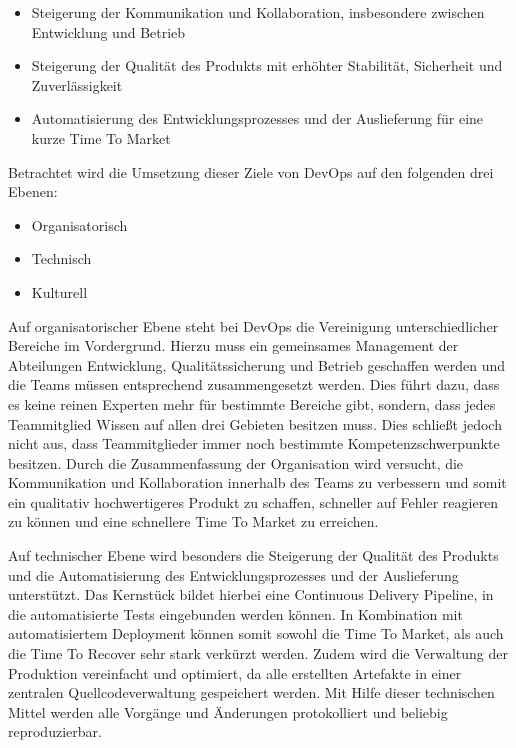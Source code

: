 \begin{itemize}
\item Steigerung der Kommunikation und Kollaboration, insbesondere zwischen Entwicklung und Betrieb
\item Steigerung der Qualität des Produkts mit erhöhter Stabilität, Sicherheit und Zuverlässigkeit
\item Automatisierung des Entwicklungsprozesses und der Auslieferung für eine kurze Time To Market
\end{itemize}

Betrachtet wird die Umsetzung dieser Ziele von DevOps auf den folgenden drei Ebenen: 

\begin{itemize}
\item Organisatorisch
\item Technisch
\item Kulturell
\end{itemize}

Auf organisatorischer Ebene steht bei DevOps die Vereinigung unterschiedlicher Bereiche im Vordergrund. 
Hierzu muss ein gemeinsames Management der Abteilungen Entwicklung, Qualitätssicherung und Betrieb geschaffen werden und die Teams müssen entsprechend zusammengesetzt werden. 
Dies führt dazu, dass es keine reinen Experten mehr für bestimmte Bereiche gibt, sondern, dass jedes Teammitglied Wissen auf allen drei Gebieten besitzen muss. 
Dies schließt jedoch nicht aus, dass Teammitglieder immer noch bestimmte Kompetenzschwerpunkte besitzen. 
Durch die Zusammenfassung der Organisation wird versucht, die Kommunikation und Kollaboration innerhalb des Teams zu verbessern und somit ein qualitativ hochwertigeres Produkt zu schaffen, schneller auf Fehler reagieren zu können und eine schnellere Time To Market zu erreichen.

Auf technischer Ebene wird besonders die Steigerung der Qualität des Produkts und die Automatisierung des Entwicklungsprozesses und der Auslieferung unterstützt. 
Das Kernstück bildet hierbei eine Continuous Delivery Pipeline, in die automatisierte Tests eingebunden werden können. 
In Kombination mit automatisiertem Deployment können somit sowohl die  Time To Market, als auch die Time To Recover sehr stark verkürzt werden.
Zudem wird die Verwaltung der Produktion vereinfacht und optimiert, da alle erstellten Artefakte in einer zentralen Quellcodeverwaltung gespeichert werden. 
Mit Hilfe dieser technischen Mittel werden alle Vorgänge und Änderungen protokolliert und beliebig reproduzierbar.


